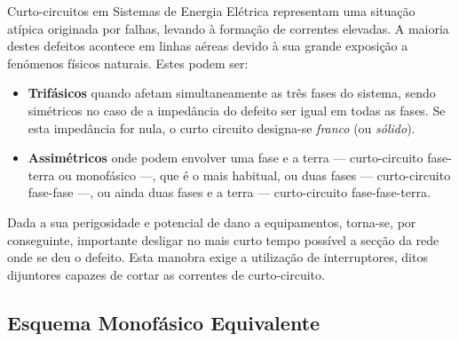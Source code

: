 \noindent Curto-circuitos em Sistemas de Energia Elétrica representam uma situação atípica originada por falhas, levando à formação de correntes elevadas. A maioria destes defeitos acontece em linhas aéreas devido à sua grande exposição a fenómenos físicos naturais. Estes podem ser:

\begin{itemize}
    \item \textbf{Trifásicos} quando afetam simultaneamente as três fases do sistema, sendo simétricos no caso de a impedância do defeito ser igual em todas as fases. Se esta impedância for nula, o curto circuito designa-se \textit{franco} (ou \textit{sólido}).

    \item \textbf{Assimétricos} onde podem envolver uma fase e a terra --- curto-circuito fase-terra ou monofásico —, que é o mais habitual, ou duas fases --- curto-circuito fase-fase ---, ou ainda duas fases e a terra --- curto-circuito fase-fase-terra.
\end{itemize}

\noindent Dada a sua perigosidade e potencial de dano a equipamentos, torna-se, por conseguinte, importante desligar no mais curto tempo possível a secção da rede onde se deu o defeito. Esta manobra exige a utilização de interruptores, ditos dijuntores capazes de cortar as correntes de curto-circuito.

\subsection{Esquema Monofásico Equivalente}

